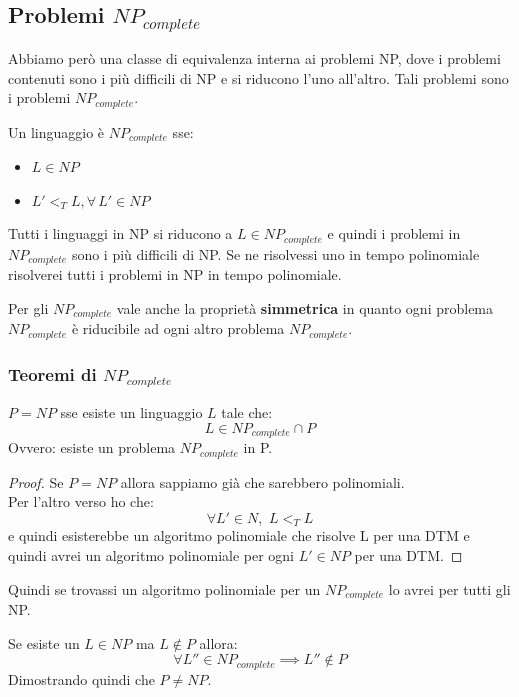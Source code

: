 \subsection{Problemi $NP_{complete}$}
Abbiamo però una classe di equivalenza interna ai problemi NP, dove i problemi
contenuti sono i più difficili di NP e si riducono l'uno all'altro. Tali
problemi sono i problemi \textbf{$NP_{complete}$}.
\begin{definizione}
  Un linguaggio è \textbf{$NP_{complete}$} sse:
  \begin{itemize}
    \item $L\in NP$
    \item $L'<_TL,\forall\,L'\in NP$
  \end{itemize}
  Tutti i linguaggi in NP si riducono a $L\in NP_{complete}$ e quindi i problemi in $NP_{complete}$ sono i più difficili di NP.
  Se ne risolvessi uno in tempo polinomiale risolverei tutti i problemi in NP in
  tempo polinomiale.
\end{definizione}
\begin{definizione}
  Per gli $NP_{complete}$ vale anche la proprietà \textbf{simmetrica} in quanto ogni problema $NP_{complete}$ è riducibile ad ogni altro problema $NP_{complete}$.
\end{definizione}
\subsubsection{Teoremi di $NP_{complete}$}
\begin{definizione}
  $P=NP$ sse esiste un linguaggio $L$ tale che:
  \[L\in NP_{complete}\cap P\]
  Ovvero: esiste un problema $NP_{complete}$ in P.
\end{definizione}
\begin{proof}
  Se $P=NP$ allora sappiamo già che sarebbero polinomiali.\\
  Per l'altro verso ho che:
  \[\forall L'\in N, \,\,L<_T L\]
  e quindi esisterebbe un algoritmo polinomiale che risolve L per una DTM e
  quindi avrei un algoritmo polinomiale per ogni $L'\in NP$ per una DTM.
\end{proof}
Quindi se trovassi un algoritmo polinomiale per un $NP_{complete}$ lo avrei per
tutti gli NP.
\begin{definizione}
  Se esiste un $L\in NP$ ma $L\not\in P$ allora:
  \[\forall L''\in \mbox{$NP_{complete}$}\implies L''\not\in P \]
Dimostrando quindi che $P\neq NP$.\\
\end{definizione}

